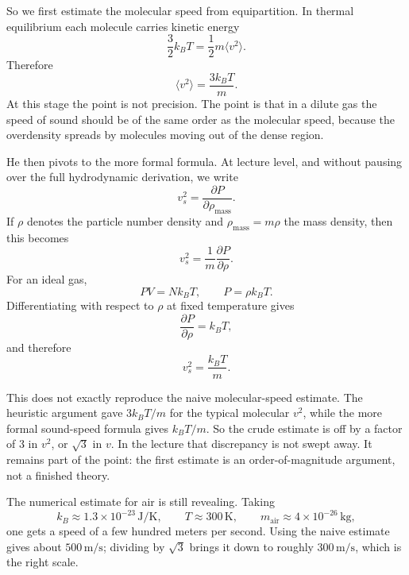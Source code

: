 So we first estimate the molecular speed from equipartition. In thermal equilibrium each molecule carries kinetic energy
\begin{equation}
\frac{3}{2}k_B T=\frac{1}{2}m\langle v^2\rangle.
\end{equation}
Therefore
\begin{equation}
\langle v^2\rangle=\frac{3k_B T}{m}.
\end{equation}
At this stage the point is not precision. The point is that in a dilute gas the speed of sound should be of the same order as the molecular speed, because the overdensity spreads by molecules moving out of the dense region.

He then pivots to the more formal formula. At lecture level, and without pausing over the full hydrodynamic derivation, we write
\begin{equation}
v_s^2=\frac{\partial P}{\partial \rho_{\mathrm{mass}}}.
\end{equation}
If \(\rho\) denotes the particle number density and \(\rho_{\mathrm{mass}}=m\rho\) the mass density, then this becomes
\begin{equation}
v_s^2=\frac{1}{m}\frac{\partial P}{\partial \rho}.
\end{equation}
For an ideal gas,
\begin{equation}
PV=Nk_B T,
\qquad
P=\rho k_B T.
\end{equation}
Differentiating with respect to \(\rho\) at fixed temperature gives
\begin{equation}
\frac{\partial P}{\partial \rho}=k_B T,
\end{equation}
and therefore
\begin{equation}
v_s^2=\frac{k_B T}{m}.
\end{equation}

This does not exactly reproduce the naive molecular-speed estimate. The heuristic argument gave \(3k_B T/m\) for the typical molecular \(v^2\), while the more formal sound-speed formula gives \(k_B T/m\). So the crude estimate is off by a factor of \(3\) in \(v^2\), or \(\sqrt{3}\) in \(v\). In the lecture that discrepancy is not swept away. It remains part of the point: the first estimate is an order-of-magnitude argument, not a finished theory.

The numerical estimate for air is still revealing. Taking
\begin{equation}
k_B \approx 1.3\times 10^{-23}\,\mathrm{J/K},
\qquad
T\approx 300\,\mathrm{K},
\qquad
m_{\mathrm{air}}\approx 4\times 10^{-26}\,\mathrm{kg},
\end{equation}
one gets a speed of a few hundred meters per second. Using the naive estimate gives about \(500\,\mathrm{m/s}\); dividing by \(\sqrt{3}\) brings it down to roughly \(300\,\mathrm{m/s}\), which is the right scale.

